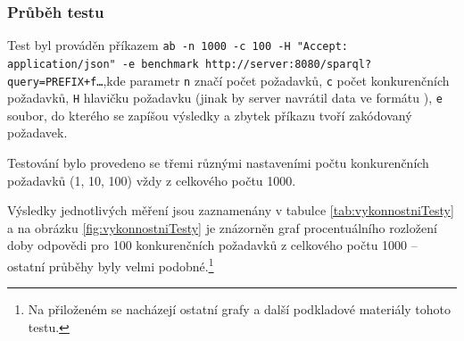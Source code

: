 \subsubsection{Průběh testu}
Test byl prováděn příkazem \texttt{ab -n 1000 -c 100 -H "Accept: application\linebreak /json"\ -e benchmark http://server:8080/sparql?query=PREFIX+f\dots},\linebreak kde parametr \texttt{n} značí počet požadavků, \texttt{c} počet konkurenčních požadavků, \texttt{H} hlavičku požadavku (jinak by server navrátil data ve formátu ), \texttt{e} soubor, do kterého se zapíšou výsledky a zbytek příkazu tvoří zakódovaný  požadavek.

Testování bylo provedeno se třemi různými nastaveními počtu konkurenčních požadavků (1, 10, 100) vždy z celkového počtu 1000.

Výsledky jednotlivých měření jsou zaznamenány v tabulce \ref{tab:vykonnostniTesty} a na obrázku \ref{fig:vykonnostniTesty} je znázorněn graf procentuálního rozložení doby odpovědi pro 100 konkurenčních požadavků z celkového počtu 1000 -- ostatní průběhy byly velmi podobné.\footnote{Na přiloženém  se nacházejí ostatní grafy a další podkladové materiály tohoto testu.}

